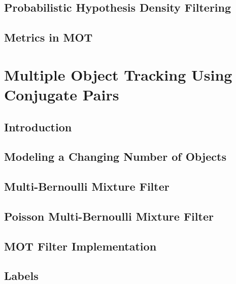 \documentclass{beamer}
\begin{document}
	\subsection{Probabilistic Hypothesis Density Filtering}
	\subsection{Metrics in MOT}
	\section{Multiple Object Tracking Using Conjugate Pairs}
	\subsection{Introduction}
	\subsection{Modeling a Changing Number of Objects}
	\subsection{Multi-Bernoulli Mixture Filter}
	\subsection{Poisson Multi-Bernoulli Mixture Filter}
	\subsection{MOT Filter Implementation}
	\subsection{Labels}
	\begin{frame}
		
	\end{frame}
\end{document}
